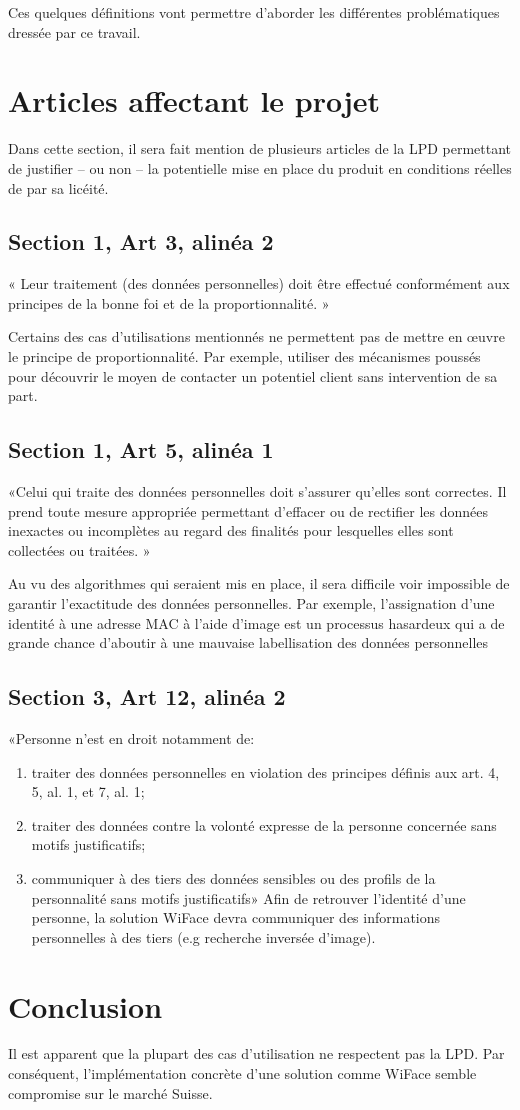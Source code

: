 Ces quelques définitions vont permettre d’aborder les différentes problématiques dressée par ce travail.

\section{Articles affectant le projet}

Dans cette section, il sera fait mention de plusieurs articles de la LPD permettant de justifier – ou non – la potentielle
mise en place du produit en conditions réelles de par sa licéité.

\subsection{Section 1, Art 3, alinéa 2}
« Leur traitement (des données personnelles) doit être effectué conformément aux principes de la bonne foi et de
la proportionnalité. »

Certains des cas d’utilisations mentionnés ne permettent pas de mettre en œuvre le principe de proportionnalité.
Par exemple, utiliser des mécanismes poussés pour découvrir le moyen de contacter un potentiel client sans
intervention de sa part.

\subsection{Section 1, Art 5, alinéa 1}
«Celui qui traite des données personnelles doit s’assurer qu’elles sont correctes. Il prend toute mesure appropriée
permettant d’effacer ou de rectifier les données inexactes ou incomplètes au regard des finalités pour lesquelles
elles sont collectées ou traitées. »

Au vu des algorithmes qui seraient mis en place, il sera difficile voir impossible de garantir l’exactitude des données
personnelles. Par exemple, l’assignation d’une identité à une adresse MAC à l’aide d’image est un processus
hasardeux qui a de grande chance d’aboutir à une mauvaise labellisation des données personnelles

\subsection{Section 3, Art 12, alinéa 2}
«Personne n’est en droit notamment de:
\begin{enumerate}[label=\alph*]
\item traiter des données personnelles en violation des principes définis aux art. 4, 5, al. 1, et 7, al. 1;
\item traiter des données contre la volonté expresse de la personne concernée sans motifs justificatifs;
\item communiquer à des tiers des données sensibles ou des profils de la personnalité sans motifs justificatifs»
Afin de retrouver l’identité d’une personne, la solution WiFace devra communiquer des informations personnelles
à des tiers (e.g recherche inversée d’image).
\end{enumerate}

\section{Conclusion}
Il est apparent que la plupart des cas d’utilisation ne respectent pas la LPD. Par conséquent, l’implémentation
concrète d’une solution comme WiFace semble compromise sur le marché Suisse.


